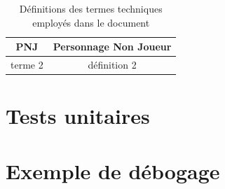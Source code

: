 \documentclass[a4paper,12pt]{article}
\begin{document}
\begin{table}[h]
    \centering
    \begin{tabular}{c c}
	\toprule
	PNJ		& Personnage Non Joueur \\
	\midrule
	terme 2		& définition 2 \\
	\bottomrule
    \end{tabular}
    \caption{Définitions des termes techniques employés dans le document}
\end{table}



\section{Tests unitaires}
\section{Exemple de débogage}

\end{document}

